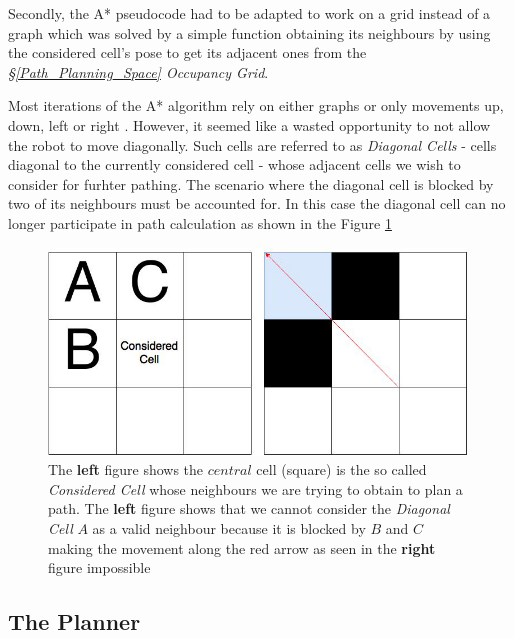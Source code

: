 \documentclass[11pt, a4paper]{article}
\begin{document}
Secondly, the A* pseudocode had to be adapted to work on a grid instead of a graph which was solved 
by a simple function obtaining its neighbours by using the considered cell's pose to get its adjacent 
ones from the \textit{\S\ref{Path_Planning_Space} Occupancy Grid}.

Most iterations of the A* algorithm rely on either graphs \cite{path_astar_grid_no_grid}  or 
only movements up, down, left or right \cite{path_astar_grid_no_diagonals}. However, it seemed like a 
wasted opportunity to not allow the robot to move diagonally. Such cells are referred to as  
\textit{Diagonal Cells} - cells diagonal to the currently considered cell - whose adjacent cells 
we wish to consider for furhter pathing. The scenario where the diagonal cell is blocked by two of 
its neighbours must be accounted for. In this case the diagonal cell can no longer participate in 
path calculation as shown in the Figure \ref{fig:diagonalcell}


\begin{figure}[H]
	  \centering
	  \includegraphics[width=30em]{../assets/fig_astar_diagonal.jpg}
          \caption{
            \label{fig:diagonalcell}
            The \textbf{left} figure shows the $central$ cell (square) is the so called \textit{Considered Cell} whose neighbours we are trying to obtain to plan a path. The \textbf{left} figure shows that we cannot consider the \textit{Diagonal Cell} $A$ as a valid neighbour because it is blocked by $B$ and $C$ making the movement along the red arrow as seen in the \textbf{right} figure impossible}
\end{figure} 









\subsection{The Planner}
\end{document}
